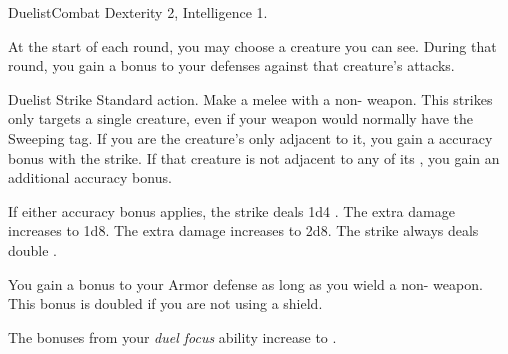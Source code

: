   \begin{feat}{Duelist}{Combat}
    \featpre Dexterity 2, Intelligence 1.

     At the start of each round, you may choose a creature you can see.
    During that round, you gain a  bonus to your defenses against that creature's attacks.

    \begin{activeability}{Duelist Strike}
      \abilityusagetime Standard action.
      \rankline
      Make a melee  with a non- weapon.
      This strikes only targets a single creature, even if your weapon would normally have the Sweeping tag.
      If you are the creature's only  adjacent to it, you gain a  accuracy bonus with the strike.
      If that creature is not adjacent to any of its , you gain an additional  accuracy bonus.

      \rankline
       If either accuracy bonus applies, the strike deals 1d4 .
       The extra damage increases to 1d8.
       The extra damage increases to 2d8.
       The strike always deals double .
    \end{activeability}

     You gain a  bonus to your Armor defense as long as you wield a non- weapon.
    This bonus is doubled if you are not using a shield.

     The bonuses from your \textit{duel focus} ability increase to .
  \end{feat}

